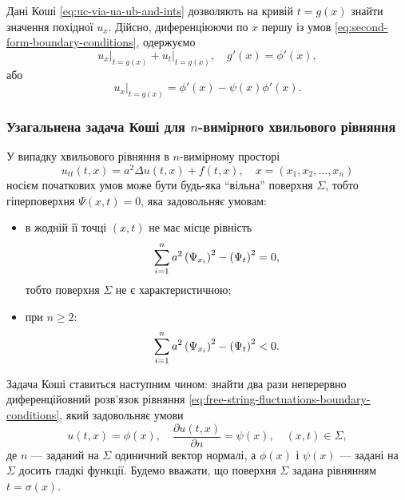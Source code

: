 Дані Коші \eqref{eq:uc-via-ua-ub-and-ints} дозволяють на кривій $t = g(x)$ знайти значення похідної $u_x$. Дійсно, диференціюючи по $x$ першу із умов \eqref{eq:second-form-boundary-conditions}, одержуємо
\begin{equation}
    \left. u_x \right|_{t = g(x)} + \left. u_t \right|_{t = g(x)}, \quad g'(x) = \phi'(x),
\end{equation}
або
\begin{equation}
    \left. u_x \right|_{t = g(x)} = \phi'(x) - \psi(x) \phi'(x).
\end{equation}

\subsubsection{Узагальнена задача Коші для \texorpdfstring{$n$}{n}-вимірного хвильового рівняння}

У випадку хвильового рівняння в $n$-вимірному просторі
\begin{equation}
    \label{eq:utt-equation}
    u_{tt}(t, x) = a^2 \Delta u(t, x) + f(t, x), \quad x = (x_1, x_2, \ldots, x_n)
\end{equation}
носієм початкових умов може бути будь-яка ``вільна'' поверхня $\Sigma$, тобто гіперповерхня $\Psi(x, t) = 0$, яка задовольняє умовам:
\begin{itemize}
    \item в жодній її точці $(x, t)$ не має місце рівність
    \begin{equation}
        \displaystyle\sum\limits_{i = 1}^n a^2 \left( \Psi_{x_i} \right)^2 - \left( \Psi_t \right)^2 = 0,
    \end{equation}
    тобто поверхня $\Sigma$ не є характеристичною;
    \item при $n \ge 2$:
    \begin{equation}
        \displaystyle\sum\limits_{i = 1}^n a^2 \left( \Psi_{x_i} \right)^2 - \left( \Psi_t \right)^2 < 0.
    \end{equation}
\end{itemize}

Задача Коші ставиться наступним чином: знайти два рази неперервно диференційовний розв'язок рівняння \eqref{eq:free-string-fluctuations-boundary-conditions}, який задовольняє умови
\begin{equation}
    \label{eq:utx-boundary-conditions}
    u(t, x) = \phi(x), \quad \frac{\partial u(t, x)}{\partial n} = \psi(x), \quad (x, t) \in \Sigma,
\end{equation}
де $n$ --- заданий на $\Sigma$ одиничний вектор нормалі, а $\phi(x)$ і $\psi(x)$ --- задані на $\Sigma$ досить гладкі функції. Будемо вважати, що поверхня $\Sigma$ задана рівнянням $t = \sigma(x)$. \medskip

